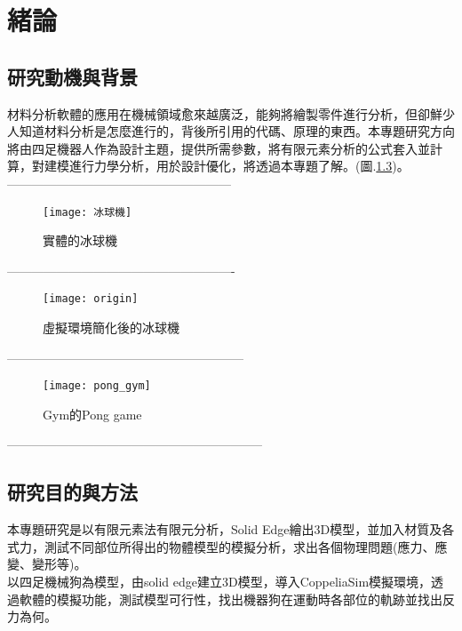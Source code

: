 \chapter{緒論}
\renewcommand{\baselinestretch}{10.0} %
\setcounter{page}{1}  %
\fontsize{14pt}{2.5pt}\sectionef

\section{研究動機與背景}
材料分析軟體的應用在機械領域愈來越廣泛，能夠將繪製零件進行分析，但卻鮮少人知道材料分析是怎麼進行的，背後所引用的代碼、原理的東西。本專題研究方向將由四足機器人作為設計主題，提供所需參數，將有限元素分析的公式套入並計算，對建模進行力學分析，用於設計優化，將透過本專題了解。(圖.\ref{fig.pong_gym})。\\
------------------------------------------------------
\begin{figure}[hbt!]
\begin{center}
\texttt{[image: 冰球機]}
\caption{\Large 實體的冰球機}\label{fig.冰球機}
\end{center}
\end{figure}
-------------------------------------------------------
\begin{figure}[hbt!]
\begin{center}
\texttt{[image: origin]}
\caption{\Large 虛擬環境簡化後的冰球機}\label{fig.模擬冰球機}
\end{center}
\end{figure}
---------------------------------------------------------
\begin{figure}[hbt!]
\begin{center}
\texttt{[image: pong\_gym]}
\caption{\Large Gym的Pong game}\label{fig.pong_gym}
\end{center}
\end{figure}
--------------------------------------------------------------

\section{研究目的與方法}
本專題研究是以有限元素法有限元分析，Solid Edge繪出3D模型，並加入材質及各式力，測試不同部位所得出的物體模型的模擬分析，求出各個物理問題(應力、應變、變形等)。\\

以四足機械狗為模型，由solid edge建立3D模型，導入CoppeliaSim模擬環境，透過軟體的模擬功能，測試模型可行性，找出機器狗在運動時各部位的軌跡並找出反力為何。\\

